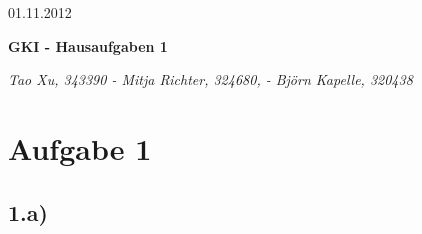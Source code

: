 \documentclass[a4paper]{article}
\begin{document}
  \begin{flushright}
    01.11.2012
  \end{flushright}
  \begin{center}
    \Large\textbf{{GKI - Hausaufgaben 1}}\\
  \end{center}

  \begin{center}
        \large\textsl{Tao Xu, 343390 - Mitja Richter, 324680, - Björn Kapelle, 320438}\\
  \end{center}


\section*{Aufgabe 1}
\subsection*{1.a)}
\end{document}
